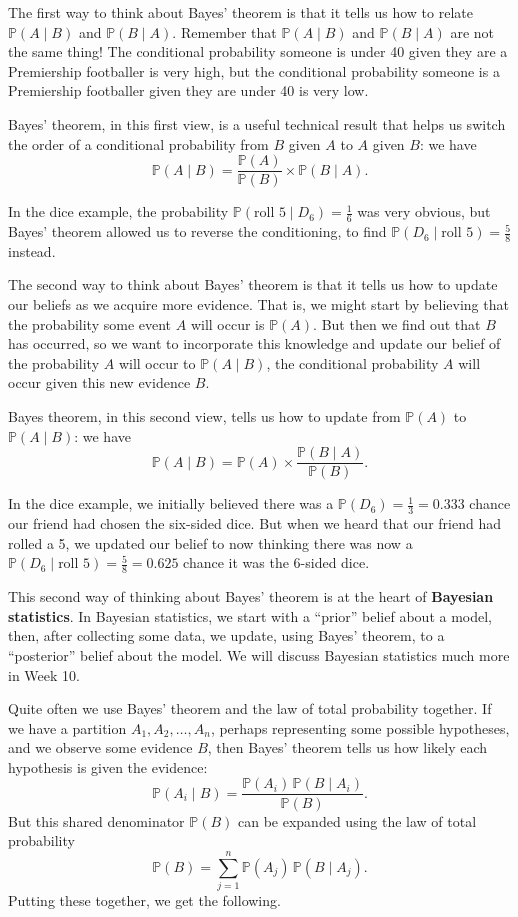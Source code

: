 \documentclass[
  a4paper,
]{book}
\theoremstyle{definition}
\theoremstyle{definition}
\theoremstyle{definition}
\theoremstyle{definition}
\theoremstyle{remark}
\begin{document}
The first way to think about Bayes' theorem is that it tells us how to relate \(\mathbb P(A \mid B)\) and \(\mathbb P(B \mid A)\). Remember that \(\mathbb P(A \mid B)\) and \(\mathbb P(B \mid A)\) are not the same thing! The conditional probability someone is under 40 given they are a Premiership footballer is very high, but the conditional probability someone is a Premiership footballer given they are under 40 is very low.

Bayes' theorem, in this first view, is a useful technical result that helps us switch the order of a conditional probability from \(B\) given \(A\) to \(A\) given \(B\): we have
\[ \mathbb P(A \mid B) = \frac{\mathbb P(A)}{\mathbb P(B)} \times \mathbb P(B \mid A) .  \]

In the dice example, the probability \(\mathbb P(\text{roll 5} \mid D_6) = \frac16\) was very obvious, but Bayes' theorem allowed us to reverse the conditioning, to find \(\mathbb P(D_6 \mid \text{roll 5}) = \frac58\) instead.

The second way to think about Bayes' theorem is that it tells us how to update our beliefs as we acquire more evidence. That is, we might start by believing that the probability some event \(A\) will occur is \(\mathbb P(A)\). But then we find out that \(B\) has occurred, so we want to incorporate this knowledge and update our belief of the probability \(A\) will occur to \(\mathbb P(A \mid B)\), the conditional probability \(A\) will occur given this new evidence \(B\).

Bayes theorem, in this second view, tells us how to update from \(\mathbb P(A)\) to \(\mathbb P(A \mid B)\): we have
\[ \mathbb P(A \mid B) = \mathbb P(A) \times \frac{\mathbb P(B \mid A)}{\mathbb P(B)} .  \]

In the dice example, we initially believed there was a \(\mathbb P(D_6) = \frac13 = 0.333\) chance our friend had chosen the six-sided dice. But when we heard that our friend had rolled a 5, we updated our belief to now thinking there was now a \(\mathbb P(D_6 \mid \text{roll 5}) =\frac58 = 0.625\) chance it was the 6-sided dice.

This second way of thinking about Bayes' theorem is at the heart of \textbf{Bayesian statistics}. In Bayesian statistics, we start with a ``prior'' belief about a model, then, after collecting some data, we update, using Bayes' theorem, to a ``posterior'' belief about the model. We will discuss Bayesian statistics much more in Week 10.

Quite often we use Bayes' theorem and the law of total probability together. If we have a partition \(A_1, A_2, \dots, A_n\), perhaps representing some possible hypotheses, and we observe some evidence \(B\), then Bayes' theorem tells us how likely each hypothesis is given the evidence:
\[ \mathbb P(A_i \mid B) = \frac{\mathbb P(A_i) \,\mathbb P(B \mid A_i)}{\mathbb P(B)} .  \]
But this shared denominator \(\mathbb P(B)\) can be expanded using the law of total probability
\[ \mathbb P(B) = \sum_{j=1}^n \mathbb P(A_j) \,\mathbb P(B \mid A_j) . \]
Putting these together, we get the following.
\end{document}
